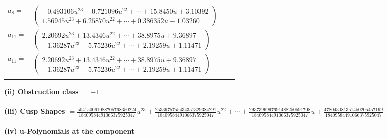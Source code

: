 \documentclass[1p]{elsarticle_modified}
\theoremstyle{definition}
\begin{document}
\begin{tabular}{m{7pt} m{180pt} m{7pt} m{180pt} }
\flushright $a_{8}=$&$\begin{pmatrix}-0.493106 u^{23}-0.721096 u^{22}+\cdots+15.8450 u+3.10392\\1.56945 u^{23}+6.25870 u^{22}+\cdots+0.386352 u-1.03260\end{pmatrix}$ \\
\flushright $a_{11}=$&$\begin{pmatrix}2.20692 u^{23}+13.4346 u^{22}+\cdots+38.8975 u+9.36897\\-1.36287 u^{23}-5.75236 u^{22}+\cdots+2.19259 u+1.11471\end{pmatrix}$\\ \flushright $a_{11}=$&$\begin{pmatrix}2.20692 u^{23}+13.4346 u^{22}+\cdots+38.8975 u+9.36897\\-1.36287 u^{23}-5.75236 u^{22}+\cdots+2.19259 u+1.11471\end{pmatrix}$\\&\end{tabular}
\flushleft \textbf{(ii) Obstruction class $= -1$}\\~\\
\flushleft \textbf{(iii) Cusp Shapes $= \frac{504150061088705768350224}{18409584491066375925047} u^{23}+\frac{2533975755434351329384291}{18409584491066375925047} u^{22}+\cdots+\frac{2937396997691488250591708}{18409584491066375925047} u+\frac{478043081351450205457199}{18409584491066375925047}$}\\~\\
\newpage\renewcommand{\arraystretch}{1}
\flushleft \textbf{(iv) u-Polynomials at the component}\newline \\
\end{document}
